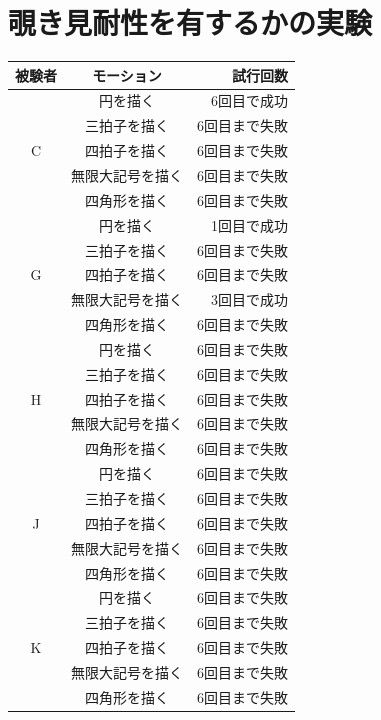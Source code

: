 \documentclass[12pt]{jreport}
\begin{document}
\section{覗き見耐性を有するかの実験}
\label{spoofingDetail}
        \begin{center}
            \begin{longtable}{|c|c|r|}
            \hline
                被験者 & モーション & 試行回数 \\ \hline \hline \endhead
                  & 円を描く & 6回目で成功 \\ \cline{2-3} %
                  & 三拍子を描く & 6回目まで失敗 \\ \cline{2-3}
                C & 四拍子を描く & 6回目まで失敗 \\ \cline{2-3}
                  & 無限大記号を描く & 6回目まで失敗 \\ \cline{2-3}
                  & 四角形を描く & 6回目まで失敗 \\ \hline %
                  & 円を描く & 1回目で成功 \\ \cline{2-3} %
                  & 三拍子を描く & 6回目まで失敗 \\ \cline{2-3}
                G & 四拍子を描く & 6回目まで失敗 \\ \cline{2-3}
                  & 無限大記号を描く & 3回目で成功 \\ \cline{2-3}
                  & 四角形を描く & 6回目まで失敗 \\ \hline %
                  & 円を描く & 6回目まで失敗 \\ \cline{2-3} %
                  & 三拍子を描く & 6回目まで失敗 \\ \cline{2-3}
                H & 四拍子を描く & 6回目まで失敗 \\ \cline{2-3}
                  & 無限大記号を描く & 6回目まで失敗 \\ \cline{2-3}
                  & 四角形を描く & 6回目まで失敗 \\ \hline %
                  & 円を描く & 6回目まで失敗 \\ \cline{2-3} %
                  & 三拍子を描く & 6回目まで失敗 \\ \cline{2-3}
                J & 四拍子を描く & 6回目まで失敗 \\ \cline{2-3}
                  & 無限大記号を描く & 6回目まで失敗 \\ \cline{2-3}
                  & 四角形を描く & 6回目まで失敗 \\ \hline %
                  & 円を描く & 6回目まで失敗 \\ \cline{2-3} %
                  & 三拍子を描く & 6回目まで失敗 \\ \cline{2-3}
                K & 四拍子を描く & 6回目まで失敗 \\ \cline{2-3}
                  & 無限大記号を描く & 6回目まで失敗 \\ \cline{2-3}
                  & 四角形を描く & 6回目まで失敗 \\ \hline %
            \end{longtable}
        \end{center}
\end{document}
